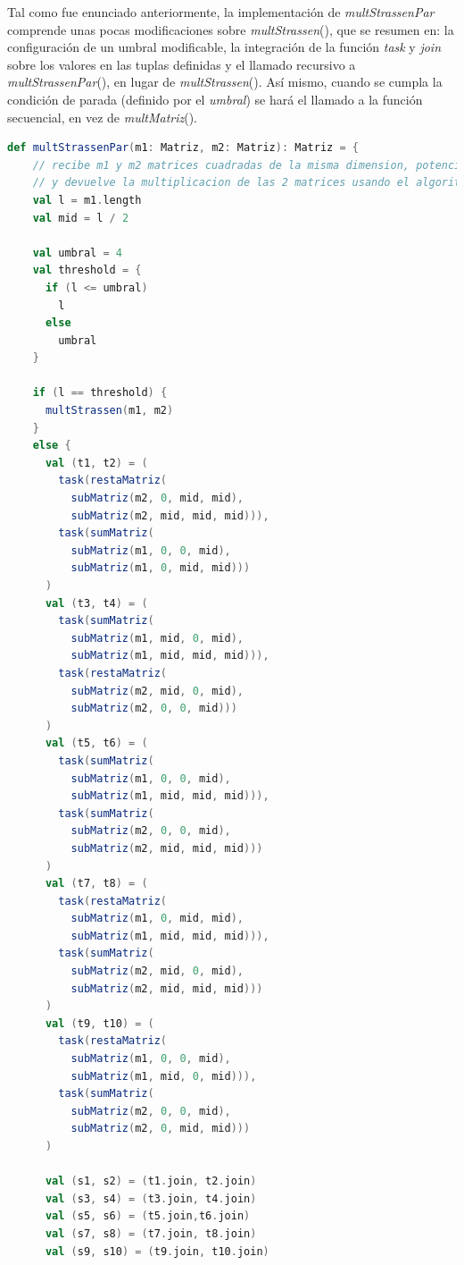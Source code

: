 \documentclass{article}
\newcounter{codesnippet}
\newcommand{\newcodesnippet}{%
  \stepcounter{codesnippet}%
}
\begin{document}
Tal como fue enunciado anteriormente, la implementación de \textit{multStrassenPar} comprende unas pocas modificaciones sobre \textit{multStrassen}(), que se resumen en: la configuración de un umbral modificable, la integración de la función \textit{task} y \textit{join} sobre los valores en las tuplas definidas y el llamado recursivo a \textit{multStrassenPar}(), en lugar de \textit{multStrassen}(). Así mismo, cuando se cumpla la condición de parada (definido por el \textit{umbral}) se hará el llamado a la función secuencial, en vez de \textit{multMatriz}().

\newcodesnippet
\begin{lstlisting}[language=Scala]
  def multStrassenPar(m1: Matriz, m2: Matriz): Matriz = {
    // recibe m1 y m2 matrices cuadradas de la misma dimension, potencia de 2
    // y devuelve la multiplicacion de las 2 matrices usando el algoritmo de Strassen
    val l = m1.length
    val mid = l / 2

    val umbral = 4
    val threshold = {
      if (l <= umbral)
        l
      else
        umbral
    }

    if (l == threshold) {
      multStrassen(m1, m2)
    }
    else {
      val (t1, t2) = (
        task(restaMatriz(
          subMatriz(m2, 0, mid, mid),
          subMatriz(m2, mid, mid, mid))),
        task(sumMatriz(
          subMatriz(m1, 0, 0, mid),
          subMatriz(m1, 0, mid, mid)))
      )
      val (t3, t4) = (
        task(sumMatriz(
          subMatriz(m1, mid, 0, mid),
          subMatriz(m1, mid, mid, mid))),
        task(restaMatriz(
          subMatriz(m2, mid, 0, mid),
          subMatriz(m2, 0, 0, mid)))
      )
      val (t5, t6) = (
        task(sumMatriz(
          subMatriz(m1, 0, 0, mid),
          subMatriz(m1, mid, mid, mid))),
        task(sumMatriz(
          subMatriz(m2, 0, 0, mid),
          subMatriz(m2, mid, mid, mid)))
      )
      val (t7, t8) = (
        task(restaMatriz(
          subMatriz(m1, 0, mid, mid),
          subMatriz(m1, mid, mid, mid))),
        task(sumMatriz(
          subMatriz(m2, mid, 0, mid),
          subMatriz(m2, mid, mid, mid)))
      )
      val (t9, t10) = (
        task(restaMatriz(
          subMatriz(m1, 0, 0, mid),
          subMatriz(m1, mid, 0, mid))),
        task(sumMatriz(
          subMatriz(m2, 0, 0, mid),
          subMatriz(m2, 0, mid, mid)))
      )

      val (s1, s2) = (t1.join, t2.join)
      val (s3, s4) = (t3.join, t4.join)
      val (s5, s6) = (t5.join,t6.join)
      val (s7, s8) = (t7.join, t8.join)
      val (s9, s10) = (t9.join, t10.join)



\end{lstlisting}
\end{document}
